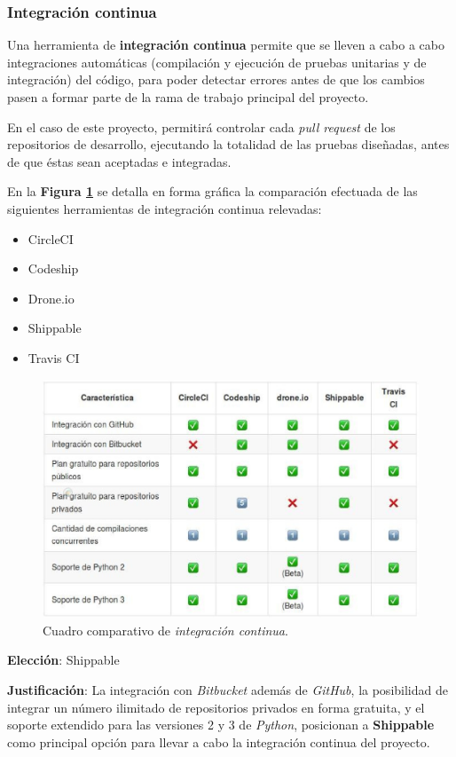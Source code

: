 \subsubsection{Integración continua}
	Una herramienta de \textbf{integración continua} permite que se lleven a cabo a cabo integraciones automáticas (compilación y ejecución de pruebas unitarias y de integración) del código, para poder detectar errores antes de que los cambios pasen a formar parte de la rama de trabajo principal del proyecto.

En el caso de este proyecto, permitirá controlar cada \textit{pull request} de los repositorios de desarrollo, ejecutando la totalidad de las pruebas diseñadas, antes de que éstas sean aceptadas e integradas.

En la \textbf{Figura \ref{comparativaIC}} se detalla en forma gráfica la comparación efectuada de las siguientes herramientas de integración continua relevadas:
\begin{itemize}
    \item CircleCI
    \item Codeship
    \item Drone.io
    \item Shippable
    \item Travis CI
\end{itemize}


\begin{figure}
  \centering
\includegraphics[width=1\textwidth]{img/tp2_definicion/integContinua}
  \caption{Cuadro comparativo de \textit{integración continua}.}
  \label{comparativaIC}
\end{figure}

\textbf{Elección}: Shippable

\textbf{Justificación}:
La integración con \textit{Bitbucket} además de \textit{GitHub}, la posibilidad de integrar un número ilimitado de repositorios privados en forma gratuita, y el soporte extendido para las versiones 2 y 3 de \textit{Python}, posicionan a \textbf{Shippable} como principal opción para llevar a cabo la integración continua del proyecto.


